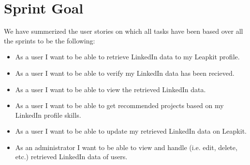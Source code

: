 \section{Sprint Goal}
We have summerized the user stories on which all tasks have been based over all the sprints to be the following:
\begin{itemize}
\item As a user I want to be able to retrieve LinkedIn data to my Leapkit profile.
\item As a user I want to be able to verify my LinkedIn data has been recieved.
\item As a user I want to be able to view the retrieved LinkedIn data.
\item As a user I want to be able to get recommended projects based on my LinkedIn profile skills.
\item As a user I want to be able to update my retrieved LinkedIn data on Leapkit.
\item As an administrator I want to be able to view and handle (i.e. edit, delete, etc.) retrieved LinkedIn data of users.
\end{itemize}

